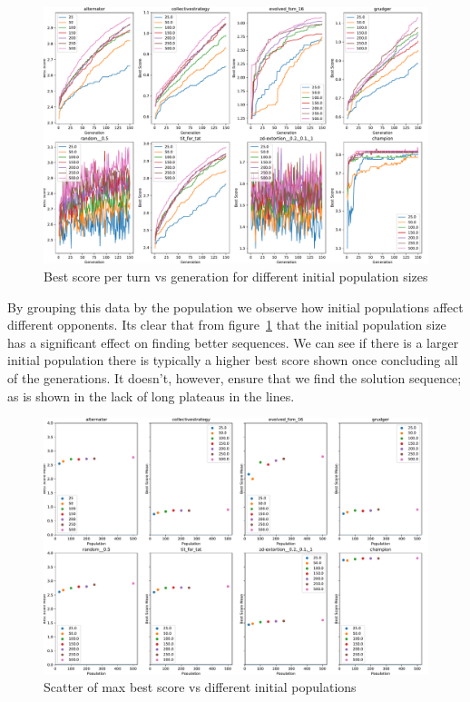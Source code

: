 \begin{figure}[ht]
    \includegraphics[width=1.0\textwidth, center]{./img/plots/INIT_POP_bs_v_gens_all.pdf}
    \caption{Best score per turn vs generation for different initial population sizes}\label{fig:INIT-POP-bs-v-gens-all}
\end{figure}

By grouping this data by the population we observe how initial populations affect different opponents.
Its clear that from figure~\ref{fig:INIT-POP-bs-v-gens-all} that the initial population size has a significant effect on finding better sequences.
We can see if there is a larger initial population there is typically a higher best score shown once concluding all of the generations.
It doesn't, however, ensure that we find the solution sequence;
as is shown in the lack of long plateaus in the lines.

\begin{figure}[ht]
    \includegraphics[width=1.0\textwidth, center]{./img/plots/INIT_POP_mean_bs_diff_v_init_pop_all.pdf}
    \caption{Scatter of max best score vs different initial populations}\label{fig:INIT-POP-mean-bs-v-init-pop-all}
\end{figure}

